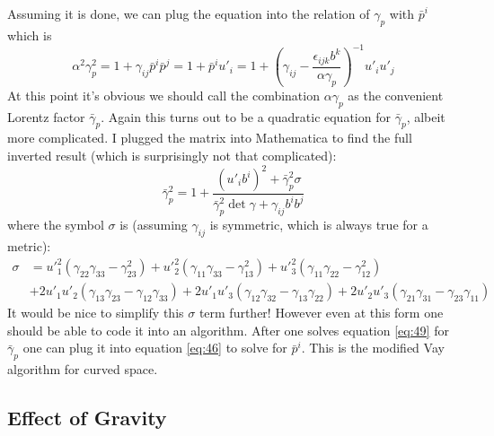 Assuming it is done, we can plug the equation into the relation of $\gamma_p$
with $\bar{p}^i$ which is
\begin{equation}
  \label{eq:48}
  \alpha^2\gamma_p^2 = 1 + \gamma_{ij}\bar{p}^i\bar{p}^j = 1 + \bar{p}^iu'_i = 1 + \left( \gamma_{ij} - \frac{\epsilon_{ijk}b^k}{\alpha\gamma_p} \right)^{-1}u'_iu'_j
\end{equation}
At this point it's obvious we should call the combination $\alpha\gamma_p$ as
the convenient Lorentz factor $\bar{\gamma}_p$. Again this turns out to be a
quadratic equation for $\bar{\gamma}_p$, albeit more complicated. I plugged the
matrix into Mathematica to find the full inverted result (which is surprisingly
not that complicated):
\begin{equation}
  \label{eq:49}
  \bar{\gamma}_p^2 = 1 + \frac{(u'_ib^i)^2 + \bar{\gamma}_p^2\sigma}{\bar{\gamma}_p^2\det \gamma + \gamma_{ij}b^ib^j}
\end{equation}
where the symbol $\sigma$ is (assuming $\gamma_{ij}$ is symmetric, which is
always true for a metric):
\begin{equation}
  \label{eq:50}
\begin{split}
  \sigma &= u'^2_{1}(\gamma_{22}\gamma_{33} - \gamma_{23}^2) + u'^2_2(\gamma_{11}\gamma_{33}-\gamma_{13}^2) + u'^2_3(\gamma_{11}\gamma_{22} - \gamma_{12}^2) \\
& + 2u'_1u'_2(\gamma_{13}\gamma_{23} - \gamma_{12}\gamma_{33}) + 2u'_1u'_3(\gamma_{12}\gamma_{32} - \gamma_{13}\gamma_{22}) + 2u'_2u'_3(\gamma_{21}\gamma_{31} - \gamma_{23}\gamma_{11})
\end{split}
\end{equation}
It would be nice to simplify this $\sigma$ term further! However even at this
form one should be able to code it into an algorithm. After one solves equation
\eqref{eq:49} for $\bar{\gamma}_p$ one can plug it into equation \eqref{eq:46}
to solve for $\bar{p}^i$. This is the modified Vay algorithm for curved space.

\subsection{Effect of Gravity}
\label{sec:gravity}

